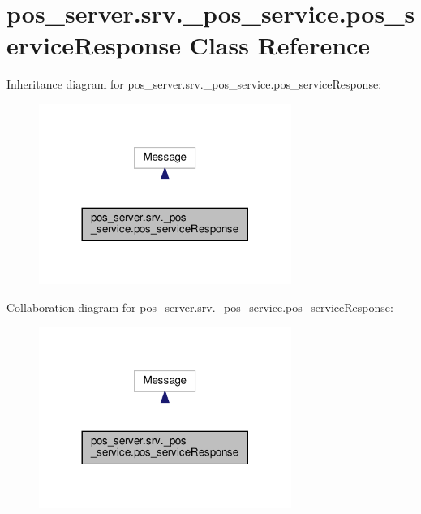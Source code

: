 \hypertarget{classpos__server_1_1srv_1_1__pos__service_1_1pos__serviceResponse}{}\section{pos\+\_\+server.\+srv.\+\_\+pos\+\_\+service.\+pos\+\_\+service\+Response Class Reference}
\label{classpos__server_1_1srv_1_1__pos__service_1_1pos__serviceResponse}


Inheritance diagram for pos\+\_\+server.\+srv.\+\_\+pos\+\_\+service.\+pos\+\_\+service\+Response\+:
\nopagebreak
\begin{figure}[H]
\begin{center}
\leavevmode
\includegraphics[width=233pt]{classpos__server_1_1srv_1_1__pos__service_1_1pos__serviceResponse__inherit__graph}
\end{center}
\end{figure}


Collaboration diagram for pos\+\_\+server.\+srv.\+\_\+pos\+\_\+service.\+pos\+\_\+service\+Response\+:
\nopagebreak
\begin{figure}[H]
\begin{center}
\leavevmode
\includegraphics[width=233pt]{classpos__server_1_1srv_1_1__pos__service_1_1pos__serviceResponse__coll__graph}
\end{center}
\end{figure}
